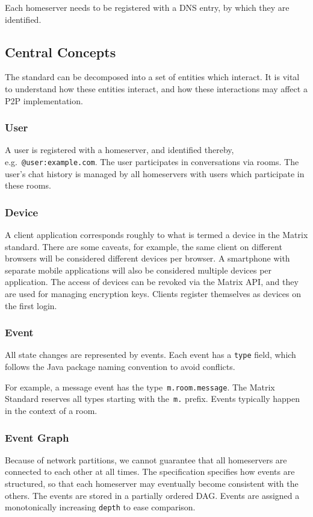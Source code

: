 Each homeserver needs to be registered with a \ac{DNS} entry, by which they are identified.

\subsection{Central Concepts}
The standard can be decomposed into a set of entities which interact.
It is vital to understand how these entities interact, and how these interactions may affect a \ac{P2P} implementation.

\subsubsection{User}
A user is registered with a homeserver, and identified thereby, e.g.~\texttt{@user:example.com}.
The user participates in conversations via rooms.
The user's chat history is managed by all homeservers with users which participate in these rooms.

\subsubsection{Device}
A client application corresponds roughly to what is termed a device in the Matrix standard.
There are some caveats, for example, the same client on different browsers will be considered different devices per browser.
A smartphone with separate mobile applications will also be considered multiple devices per application.
The access of devices can be revoked via the Matrix \ac{API}, and they are used for managing encryption keys.
Clients register themselves as devices on the first login.

\subsubsection{Event}
All state changes are represented by events.
Each event has a \texttt{type} field, which follows the Java package naming convention to avoid conflicts.

For example, a message event has the type~\texttt{m.room.message}.
The Matrix Standard reserves all types starting with the~\texttt{m.} prefix.
Events typically happen in the context of a room.

\subsubsection{Event Graph}
Because of network partitions, we cannot guarantee that all homeservers are connected to each other at all times.
The specification specifies how events are structured, so that each homeserver may eventually become consistent with the others.
The events are stored in a partially ordered \ac{DAG}.
Events are assigned a monotonically increasing \texttt{depth} to ease comparison.

